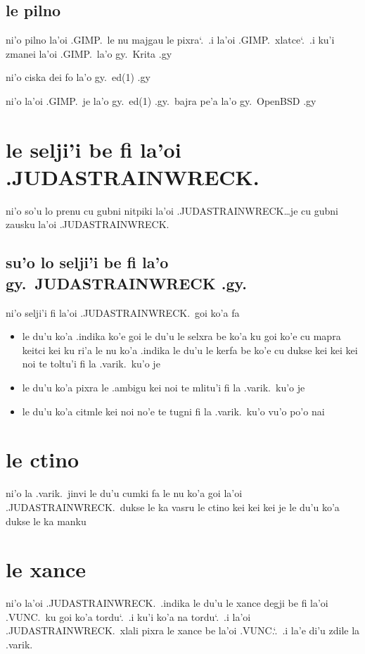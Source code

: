 \documentclass{report}
\newcommand\sds{\spacefactor\sfcode`.\ \space}
\begin{document}
\subsection{le pilno}
ni'o pilno la'oi .GIMP.\ le nu majgau le pixra\sds  .i  la'oi .GIMP.\ xlatce\sds  .i ku'i zmanei la'oi .GIMP.\ la'o gy.\ Krita .gy

ni'o ciska dei fo la'o gy.\ ed(1) .gy

ni'o la'oi .GIMP.\ je la'o gy.\ ed(1) .gy.\ bajra pe'a la'o gy.\ OpenBSD .gy

\section{le selji'i be fi la'oi .JUDASTRAINWRECK.}
ni'o so'u lo prenu cu gubni nitpiki la'oi .JUDASTRAINWRECK\ldots je cu gubni zausku la'oi .JUDASTRAINWRECK.

\subsection{su'o lo selji'i be fi la'o gy.\ JUDASTRAINWRECK .gy.}
ni'o selji'i fi la'oi .JUDASTRAINWRECK.\ goi ko'a fa
\begin{itemize}
	\item le du'u ko'a .indika ko'e goi le du'u le selxra be ko'a ku goi ko'e cu mapra keitci kei ku ri'a le nu ko'a .indika le du'u le kerfa be ko'e cu dukse kei kei kei noi te toltu'i fi la .varik.\ ku'o je
	\item le du'u ko'a pixra le .ambigu kei noi te mlitu'i fi la .varik.\ ku'o je
	\item le du'u ko'a citmle kei noi no'e te tugni fi la .varik.\ ku'o
vu'o po'o nai
\end{itemize}
\section{le ctino}
ni'o la .varik.\ jinvi le du'u cumki fa le nu ko'a goi la'oi .JUDASTRAINWRECK.\ dukse le ka vasru le ctino kei kei kei je le du'u ko'a dukse le ka manku

\section{le xance}
ni'o la'oi .JUDASTRAINWRECK.\ .indika le du'u le xance degji be fi la'oi .VUNC.\ ku goi ko'a tordu\sds  .i ku'i ko'a na tordu\sds  .i la'oi .JUDASTRAINWRECK.\ xlali pixra le xance be la'oi .VUNC.\sds  .i la'e di'u zdile la .varik.
\end{document}
